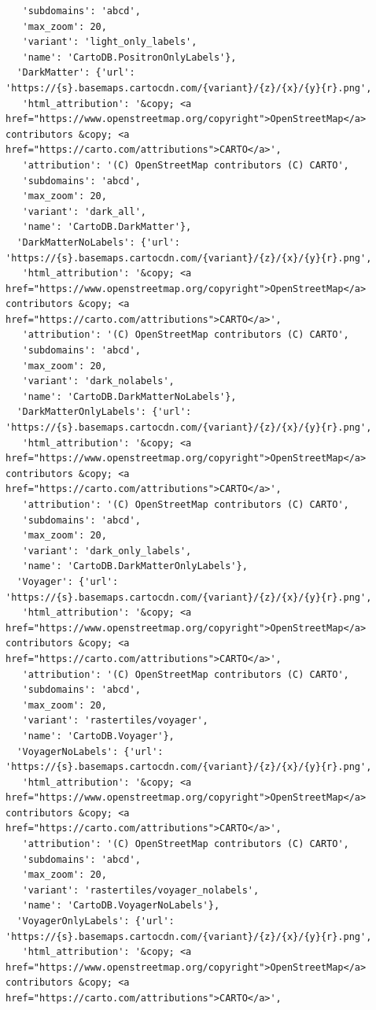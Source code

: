 \documentclass[
  letterpaper,
  DIV=11,
  numbers=noendperiod]{scrreprt}
\begin{document}
\begin{verbatim}
   'subdomains': 'abcd',
   'max_zoom': 20,
   'variant': 'light_only_labels',
   'name': 'CartoDB.PositronOnlyLabels'},
  'DarkMatter': {'url': 'https://{s}.basemaps.cartocdn.com/{variant}/{z}/{x}/{y}{r}.png',
   'html_attribution': '&copy; <a href="https://www.openstreetmap.org/copyright">OpenStreetMap</a> contributors &copy; <a href="https://carto.com/attributions">CARTO</a>',
   'attribution': '(C) OpenStreetMap contributors (C) CARTO',
   'subdomains': 'abcd',
   'max_zoom': 20,
   'variant': 'dark_all',
   'name': 'CartoDB.DarkMatter'},
  'DarkMatterNoLabels': {'url': 'https://{s}.basemaps.cartocdn.com/{variant}/{z}/{x}/{y}{r}.png',
   'html_attribution': '&copy; <a href="https://www.openstreetmap.org/copyright">OpenStreetMap</a> contributors &copy; <a href="https://carto.com/attributions">CARTO</a>',
   'attribution': '(C) OpenStreetMap contributors (C) CARTO',
   'subdomains': 'abcd',
   'max_zoom': 20,
   'variant': 'dark_nolabels',
   'name': 'CartoDB.DarkMatterNoLabels'},
  'DarkMatterOnlyLabels': {'url': 'https://{s}.basemaps.cartocdn.com/{variant}/{z}/{x}/{y}{r}.png',
   'html_attribution': '&copy; <a href="https://www.openstreetmap.org/copyright">OpenStreetMap</a> contributors &copy; <a href="https://carto.com/attributions">CARTO</a>',
   'attribution': '(C) OpenStreetMap contributors (C) CARTO',
   'subdomains': 'abcd',
   'max_zoom': 20,
   'variant': 'dark_only_labels',
   'name': 'CartoDB.DarkMatterOnlyLabels'},
  'Voyager': {'url': 'https://{s}.basemaps.cartocdn.com/{variant}/{z}/{x}/{y}{r}.png',
   'html_attribution': '&copy; <a href="https://www.openstreetmap.org/copyright">OpenStreetMap</a> contributors &copy; <a href="https://carto.com/attributions">CARTO</a>',
   'attribution': '(C) OpenStreetMap contributors (C) CARTO',
   'subdomains': 'abcd',
   'max_zoom': 20,
   'variant': 'rastertiles/voyager',
   'name': 'CartoDB.Voyager'},
  'VoyagerNoLabels': {'url': 'https://{s}.basemaps.cartocdn.com/{variant}/{z}/{x}/{y}{r}.png',
   'html_attribution': '&copy; <a href="https://www.openstreetmap.org/copyright">OpenStreetMap</a> contributors &copy; <a href="https://carto.com/attributions">CARTO</a>',
   'attribution': '(C) OpenStreetMap contributors (C) CARTO',
   'subdomains': 'abcd',
   'max_zoom': 20,
   'variant': 'rastertiles/voyager_nolabels',
   'name': 'CartoDB.VoyagerNoLabels'},
  'VoyagerOnlyLabels': {'url': 'https://{s}.basemaps.cartocdn.com/{variant}/{z}/{x}/{y}{r}.png',
   'html_attribution': '&copy; <a href="https://www.openstreetmap.org/copyright">OpenStreetMap</a> contributors &copy; <a href="https://carto.com/attributions">CARTO</a>',

\end{verbatim}
\end{document}
